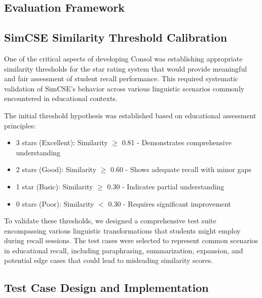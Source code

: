 \subsection{Evaluation Framework}

\subsection{SimCSE Similarity Threshold Calibration}

{\color{maroon}
One of the critical aspects of developing Consol was establishing appropriate similarity thresholds for the star rating system that would provide meaningful and fair assessment of student recall performance. This required systematic validation of SimCSE's behavior across various linguistic scenarios commonly encountered in educational contexts.

The initial threshold hypothesis was established based on educational assessment principles:
\begin{itemize}
    \item 3 stars (Excellent): Similarity $\geq$ 0.81 - Demonstrates comprehensive understanding
    \item 2 stars (Good): Similarity $\geq$ 0.60 - Shows adequate recall with minor gaps
    \item 1 star (Basic): Similarity $\geq$ 0.30 - Indicates partial understanding
    \item 0 stars (Poor): Similarity $<$ 0.30 - Requires significant improvement
\end{itemize}

To validate these thresholds, we designed a comprehensive test suite encompassing various linguistic transformations that students might employ during recall sessions. The test cases were selected to represent common scenarios in educational recall, including paraphrasing, summarization, expansion, and potential edge cases that could lead to misleading similarity scores.
}

\subsection{Test Case Design and Implementation}

